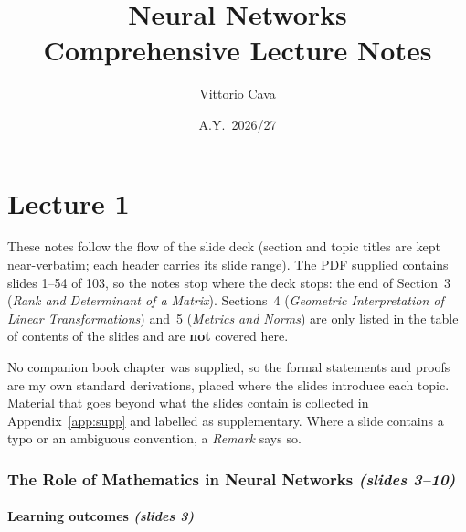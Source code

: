 \documentclass[11pt,a4paper]{article}
\title{\textbf{Neural Networks}\\[6pt]\large Comprehensive Lecture Notes}
\author{Vittorio Cava}
\date{A.Y.~2026/27}
\newcommand{\slides}[1]{\texorpdfstring{\emph{(slides #1)}}{(slides #1)}}
\theoremstyle{definition}
\theoremstyle{plain}
\begin{document}
\maketitle
\tableofcontents
\newpage

\setcounter{section}{0}
\renewcommand{\thesection}{\arabic{section}}
\part{Lecture 1}

\begin{tcolorbox}[colback=gray!6,colframe=gray!60,boxrule=0.5pt,arc=2pt,title={\small\bfseries Scope of these notes}]
\small
These notes follow the flow of the slide deck (section and topic titles are kept near-verbatim; each header carries its slide range). The PDF supplied contains slides 1--54 of 103, so the notes stop where the deck stops: the end of Section~3 (\emph{Rank and Determinant of a Matrix}). Sections~4 (\emph{Geometric Interpretation of Linear Transformations}) and~5 (\emph{Metrics and Norms}) are only listed in the table of contents of the slides and are \textbf{not} covered here.

No companion book chapter was supplied, so the formal statements and proofs are my own standard derivations, placed where the slides introduce each topic. Material that goes beyond what the slides contain is collected in Appendix~\ref{app:supp} and labelled as supplementary. Where a slide contains a typo or an ambiguous convention, a \emph{Remark} says so.
\end{tcolorbox}

\section{The Role of Mathematics in Neural Networks \slides{3--10}}

\subsection{Learning outcomes \slides{3}}
\end{document}
